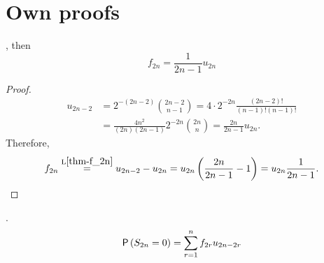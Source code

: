 \chapter{Own proofs}
\begin{lemma}\label{lemma-f_2n=frac}
  \Lrws, then
 \[
 f_{2n}=\frac{1}{2n-1}u_{2n}
 \]
\end{lemma}
\begin{proof}
 \[
  \begin{split}
    u_{2n-2} & =2^{-(2n-2)}\binom{2n-2}{n-1}=4\cdot 2^{-2n} \frac{ \left( 2n-2 \right) !}{ \left( n-1 \right) ! \left( n-1 \right) !}\\
    & =\frac{4n^2}{ \left( 2n \right) \left( 2n-1 \right) }2^{-2n}\binom{2n}{n}
    =\frac{2n}{2n-1}u_{2n}.
  \end{split}
 \]
 Therefore,
 \[
 f_{2n} \overset{\text{L}\ref{thm-f_2n}}{=} u_{2n-2}-u_{2n}=u_{2n} \left( \frac{2n}{2n-1}-1 \right)
 =u_{2n}\frac{1}{2n-1}.
 \]
\end{proof}

\begin{lemma}[Decomposition of $f_n$]\label{lemma-decomposition_f_n}
  \Lrws.
  \[
  \pr\left(S_{2n}=0\right)=\suma[r][1][n] f_{2r}u_{2n-2r}
  \]
\end{lemma}

